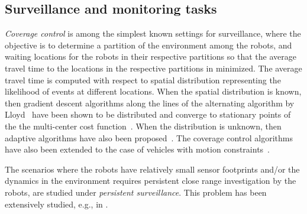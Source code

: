 \subsection{Surveillance and monitoring tasks}
\emph{Coverage control} is among the simplest known settings for surveillance, where the objective is to determine a partition of the environment among the robots, and waiting locations for the robots in their respective partitions so that the average travel time to the locations in the respective partitions in minimized. The average travel time is computed with respect to spatial distribution representing the likelihood of events at different locations. When the spatial distribution is known, then gradient descent algorithms along the lines of the alternating algorithm by Lloyd~\cite{Lloyd:82} have been shown to be distributed and converge to stationary points of the the multi-center cost function~\cite{cortes04}. When the distribution is unknown, then adaptive algorithms have also been proposed~\cite{Arsie.Savla.ea:TAC09,Schwager:2009fz}. The coverage control algorithms have also been extended to the case of vehicles with motion constraints~\cite{Savla.Frazzoli:WAFR08,Enright.Savla.ea:JGCD09}. 

The scenarios where the robots have relatively small sensor footprints and/or the dynamics in the environment requires persistent close range investigation by the robots, are studied under  \emph{persistent surveillance}. This problem has been extensively studied, e.g., in \cite{Huynh.Enright.ea:10,Smith.Schwager.ea:11,Smith.Schwager.ea:12,Enright.Frazzoli:12,Yu.Schwager.ea:14}.



